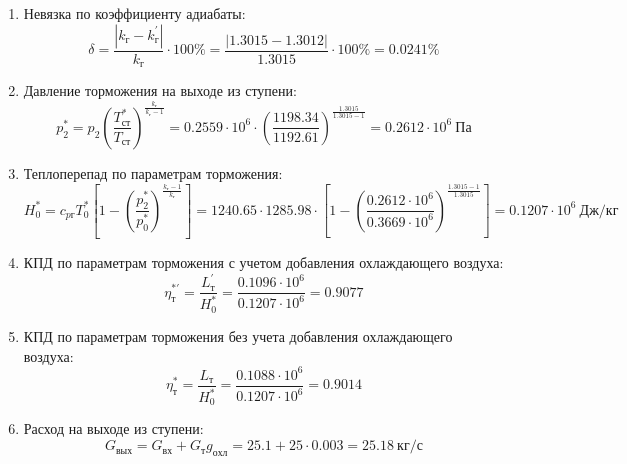 \documentclass[a4paper,10pt]{article}
\begin{document}
\begin{enumerate}
        \item Невязка по коэффициенту адиабаты:
        \[
            \delta = \frac{ \left| k_г - k_г^\prime \right| }{ k_г } \cdot 100 \%=
                \frac{
                    \left| 1.3015 - 1.3012 \right|
                }{
                    1.3015
                } \cdot 100 \% =
            0.0241 \%
        \]

        \item Давление торможения на выходе из ступени:
        \[
            p_2^* = p_2 \left(
                            \frac{ T_{ст}^* }{ T_{ст} }
                    \right) ^ \frac{ k_г }{ k_г - 1 } =
                 0.2559 \cdot 10^6 \cdot \left(
                            \frac{ 1198.34 }{ 1192.61 }
                    \right) ^
                \frac{ 1.3015 }{ 1.3015 - 1 } =
            0.2612 \cdot 10^6 \ Па
        \]

        \item Теплоперепад по параметрам торможения:
        \[
            H_0^* = c_{pг} T_0^* \left[
                        1 - \left(
                                \frac{p_2^*}{p_0^*}
                            \right) ^
                        \frac{k_г - 1}{k_г}
                    \right] =
            1240.65 \cdot 1285.98 \cdot
                    \left[
                        1 - \left(
                                \frac{
                                    0.2612 \cdot 10^6
                                }{
                                    0.3669 \cdot 10^6
                                }
                            \right) ^
                        \frac{1.3015 - 1}{1.3015}
                    \right] =
            0.1207 \cdot 10^6 \ Дж/кг
        \]

        \item КПД по параметрам торможения с учетом добавления охлаждающего воздуха:
        \[
            \eta_т^{*\prime} = \frac{ L_т^\prime }{ H_0^* } =
                \frac{
                    0.1096 \cdot 10^6
                }{
                    0.1207 \cdot 10^6 } =
            0.9077
        \]

        \item КПД по параметрам торможения без учета добавления охлаждающего воздуха:
        \[
            \eta_т^* = \frac{ L_т }{ H_0^* } =
                \frac{
                    0.1088 \cdot 10^6
                }{
                    0.1207 \cdot 10^6 } =
            0.9014
        \]

        \item Расход на выходе из ступени:
        \[
            G_{вых} = G_{вх} + G_т g_{охл} =
                25.1 + 25 \cdot
                0.003 =
            25.18 \ кг/с
        \]


\end{enumerate}
\end{document}

